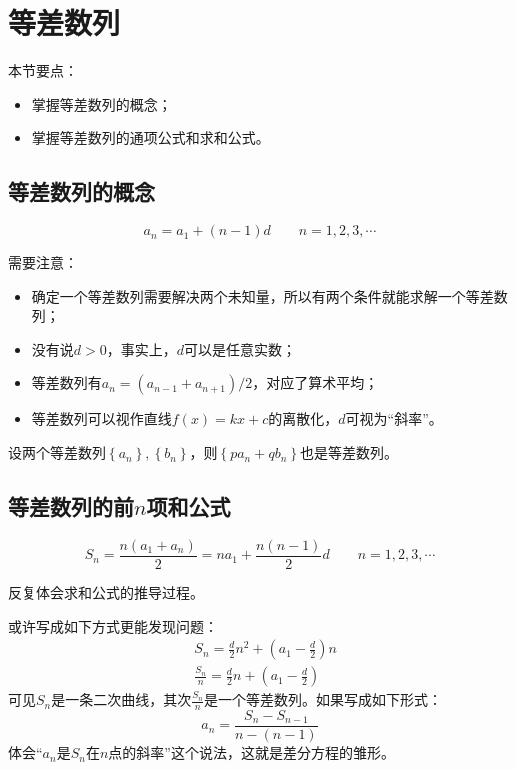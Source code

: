 \section{等差数列}

本节要点：
\begin{itemize}
    \item 掌握等差数列的概念；
    \item 掌握等差数列的通项公式和求和公式。
\end{itemize}

\subsection{等差数列的概念}

\[
a_n=a_1+\left( n-1 \right) d \qquad n=1,2,3,\cdots
\]

需要注意：
\begin{itemize}
    \item 确定一个等差数列需要解决两个未知量，所以有两个条件就能求解一个等差数列；
    \item 没有说$d>0$，事实上，$d$可以是任意实数；
    \item 等差数列有$a_n=\left( a_{n-1}+a_{n+1} \right) /2$，对应了算术平均；
    \item 等差数列可以视作直线$f\left( x \right) =kx+c$的离散化，$d$可视为“斜率”。
\end{itemize}

\begin{theorem}
设两个等差数列$\left\{ a_n \right\} ,\left\{ b_n \right\} $，则$\left\{ pa_n+qb_n \right\} $也是等差数列。
\end{theorem}

\subsection{等差数列的前\texorpdfstring{$n$}{n}项和公式}

\[
S_n=\frac{n\left( a_1+a_n \right)}{2}=na_1+\frac{n\left( n-1 \right)}{2}d \qquad n=1,2,3,\cdots
\]

\begin{tcolorbox}
反复体会求和公式的推导过程。
\end{tcolorbox}

或许写成如下方式更能发现问题：
\begin{align*}
&S_n=\frac{d}{2}n^2+\left( a_1-\frac{d}{2} \right) n \\
&\frac{S_n}{n}=\frac{d}{2}n+\left( a_1-\frac{d}{2} \right)
\end{align*}
可见$S_n$是一条二次曲线，其次$\frac{S_n}{n}$是一个等差数列。如果写成如下形式：
\[
a_n=\frac{S_n-S_{n-1}}{n-\left( n-1 \right)}
\]
体会“$a_n$是$S_n$在$n$点的斜率”这个说法，这就是差分方程的雏形。

